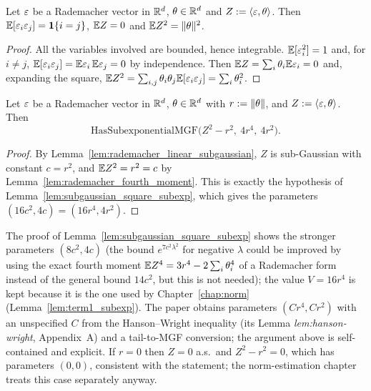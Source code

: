 \begin{lemma}\label{lem:rademacher_fourth_moment}
\leanok
{}
Let $\varepsilon$ be a Rademacher vector in $\mathbb{R}^d$, $\theta\in\mathbb{R}^d$ and $Z := \langle \varepsilon, \theta \rangle$. Then
$\mathbb{E}[\varepsilon_i\varepsilon_j] = \mathbf{1}\{i = j\}$, $\mathbb{E} Z = 0$ and $\mathbb{E} Z^2 = \lVert \theta \rVert^2$.
\end{lemma}

\begin{proof}
\leanok
{}
All the variables involved are bounded, hence integrable. $\mathbb{E}[\varepsilon_i^2] = 1$ and, for
$i \ne j$, $\mathbb{E}[\varepsilon_i\varepsilon_j] = \mathbb{E}\varepsilon_i\,\mathbb{E}\varepsilon_j = 0$ by independence. Then
$\mathbb{E} Z = \sum_i\theta_i\mathbb{E}\varepsilon_i = 0$ and, expanding the square,
$\mathbb{E} Z^2 = \sum_{i,j}\theta_i\theta_j\mathbb{E}[\varepsilon_i\varepsilon_j] = \sum_i\theta_i^2$.
\end{proof}

\begin{lemma}
\label{lem:rademacher_square_subexp}
\leanok
{}
Let $\varepsilon$ be a Rademacher vector in $\mathbb{R}^d$, $\theta \in \mathbb{R}^d$ with $r := \lVert \theta \rVert$, and
$Z := \langle \varepsilon, \theta \rangle$. Then
\[
  \mathrm{HasSubexponentialMGF}\big(Z^2 - r^2,\ 4r^4,\ 4r^2\big).
\]
\end{lemma}

\begin{proof}
\leanok
{}
By Lemma~\ref{lem:rademacher_linear_subgaussian}, $Z$ is sub-Gaussian with constant
$c = r^2$, and $\mathbb{E} Z^2 = r^2 = c$ by Lemma~\ref{lem:rademacher_fourth_moment}. This is exactly
the hypothesis of Lemma~\ref{lem:subgaussian_square_subexp}, which gives the parameters
$(16c^2, 4c) = (16r^4, 4r^2)$.
\end{proof}

\begin{remark}[Constants, and the case $r = 0$]\label{rem:ps_rademacher_constants}
The proof of Lemma~\ref{lem:subgaussian_square_subexp} shows the stronger parameters
$(8c^2, 4c)$ (the bound $e^{7c^2\lambda^2}$ for negative $\lambda$ could be improved by using
the exact fourth moment $\mathbb{E} Z^4 = 3r^4 - 2\sum_i\theta_i^4$ of a Rademacher form instead of
the general bound $14c^2$, but this is not needed); the value $V = 16r^4$ is kept because it is
the one used by Chapter~\ref{chap:norm} (Lemma~\ref{lem:term1_subexp}). The paper obtains
parameters $(Cr^4, Cr^2)$ with an unspecified $C$ from the Hanson--Wright inequality (its
Lemma \emph{lem:hanson-wright}, Appendix~A) and a tail-to-MGF conversion; the argument above
is self-contained and explicit. If $r = 0$ then $Z = 0$ a.s.\ and $Z^2 - r^2 = 0$, which has
parameters $(0, 0)$, consistent with the statement; the norm-estimation chapter treats this
case separately anyway.
\end{remark}

